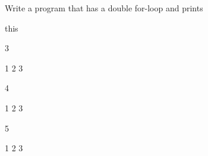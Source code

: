 Write a program that has a double for-loop and prints

this

\begin{console}

3

  1 2 3

4

  1 2 3

5

  1 2 3 

\end{console}

